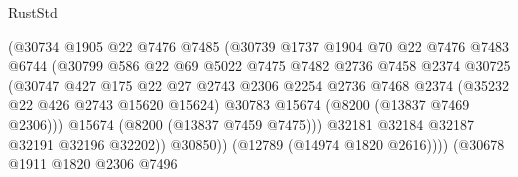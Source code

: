 \begin{lexlean}{RustStd}
\begin{coremodule}
                                    (@30734
                                      @1905
                                      @22
                                      @7476
                                      @7485
                                      (@30739
                                        @1737
                                        @1904
                                        @70
                                        @22
                                        @7476
                                        @7483
                                        @6744
                                        (@30799
                                          @586
                                          @22
                                          @69
                                          @5022
                                          @7475
                                          @7482
                                          @2736
                                          @7458
                                          @2374
                                          @30725
                                          (@30747
                                            @427
                                            @175
                                            @22
                                            @27
                                            @2743
                                            @2306
                                            @2254
                                            @2736
                                            @7468
                                            @2374
                                            (@35232 @22 @426 @2743 @15620 @15624)
                                            @30783
                                            @15674
                                            (@8200 (@13837 @7469 @2306)))
                                          @15674
                                          (@8200 (@13837 @7459 @7475)))
                                        @32181
                                        @32184
                                        @32187
                                        @32191
                                        @32196
                                        @32202))
                                    @30850))
                                (@12789 (@14974 @1820 @2616))))
                            (@30678
                              @1911
                              @1820
                              @2306
                              @7496

\end{coremodule}
\end{lexlean}
